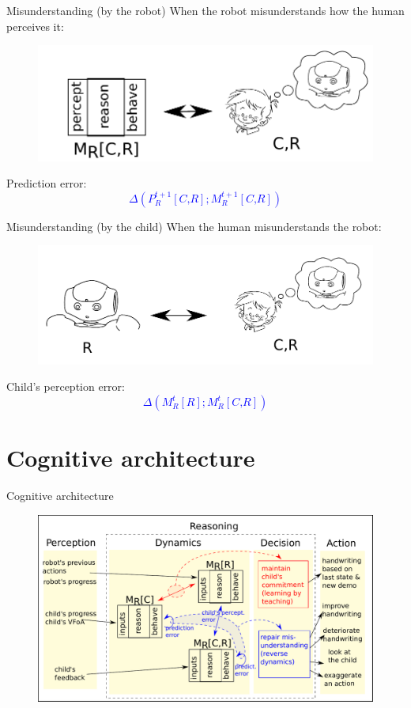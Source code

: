 \documentclass[compress]{beamer}
\begin{document}
\begin{frame}{Misunderstanding (by the robot)}
When the robot misunderstands how the human perceives it:
\centering
\begin{figure}
\includegraphics[width=0.8\columnwidth]{true_mis12}
\end{figure}
Prediction error:
\huge
\textcolor{blue}{$$\Delta \left(P^{t+1}_R\left[\textit{C,R}\right] ; M^{t+1}_R\left[\textit{C,R}\right] \right)$$}
\end{frame}

\begin{frame}{Misunderstanding (by the child)}
When the human misunderstands the robot:
\centering
\begin{figure}
\includegraphics[width=0.9\columnwidth]{true_mis2}
\end{figure}

Child's perception error:
\huge
\textcolor{blue}{$$\Delta \left( M^t_R\left[\textit{R}\right] ; M^t_R\left[\textit{C,R}\right]\right)$$}
\end{frame}


\section*{Cognitive architecture}

\begin{frame}{Cognitive architecture}
\centering
\begin{figure}
\includegraphics[width=1.\columnwidth]{final_archi}
\end{figure}
\end{frame}
\end{document}
